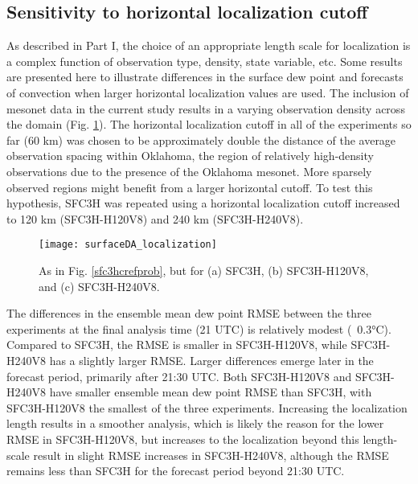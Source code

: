 \subsection{Sensitivity to horizontal localization cutoff}
As described in Part I, the choice of an appropriate length scale for localization is a complex function of observation type, density, state variable, etc. Some results are presented here to illustrate differences in the surface dew point and forecasts of convection when larger horizontal localization values are used. The inclusion of mesonet data in the current study results in a varying observation density across the domain (Fig. \ref{sfcdaloc}). The horizontal localization cutoff in all of the experiments so far (60 km) was chosen to be approximately double the distance of the average observation spacing within Oklahoma, the region of relatively high-density observations due to the presence of the Oklahoma mesonet. More sparsely observed regions might benefit from a larger horizontal cutoff. To test this hypothesis, SFC3H was repeated using a horizontal localization cutoff increased to 120 km (SFC3H-H120V8) and 240 km (SFC3H-H240V8).
\begin{figure}
\centering
\texttt{[image: surfaceDA\_localization]}
\caption{As in Fig. \ref{sfc3hcrefprob}, but for (a) SFC3H, (b) SFC3H-H120V8, and (c) SFC3H-H240V8.}
\label{sfcdaloc}
\end{figure}
The differences in the ensemble mean dew point RMSE between the three experiments at the final analysis time (21 UTC) is relatively modest (~0.3°C). Compared to SFC3H, the RMSE is smaller in SFC3H-H120V8, while SFC3H-H240V8 has a slightly larger RMSE. Larger differences emerge later in the forecast period, primarily after 21:30 UTC. Both SFC3H-H120V8 and SFC3H-H240V8 have smaller ensemble mean dew point RMSE than SFC3H, with SFC3H-H120V8 the smallest of the three experiments. Increasing the localization length results in a smoother analysis, which is likely the reason for the lower RMSE in SFC3H-H120V8, but increases to the localization beyond this length-scale result in slight RMSE increases in SFC3H-H240V8, although the RMSE remains less than SFC3H for the forecast period beyond 21:30 UTC.

